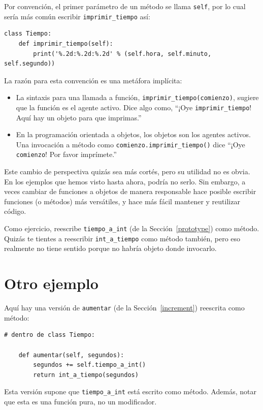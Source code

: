 \documentclass[10pt]{book}
\begin{document}
Por convención, el primer parámetro de un método se
llama {\tt self}, por lo cual sería más común escribir
\verb"imprimir_tiempo" así:

\begin{verbatim}
class Tiempo:
    def imprimir_tiempo(self):
        print('%.2d:%.2d:%.2d' % (self.hora, self.minuto, self.segundo))
\end{verbatim}
%
La razón para esta convención es una metáfora implícita:

\begin{itemize}

\item La sintaxis para una llamada a función, \verb"imprimir_tiempo(comienzo)",
  sugiere que la función es el agente activo.  Dice algo
  como, ``¡Oye \verb"imprimir_tiempo"!  Aquí hay un objeto para que imprimas.''

\item En la programación orientada a objetos, los objetos son los agentes
  activos.  Una invocación a método como \verb"comienzo.imprimir_tiempo()" dice
  ``¡Oye {\tt comienzo}!  Por favor imprímete.''

\end{itemize}

Este cambio de perspectiva quizás sea más cortés, pero su utilidad
no es obvia.  En los ejemplos que hemos visto hasta ahora, podría no
serlo.  Sin embargo, a veces cambiar de funciones a objetos de manera
responsable hace posible escribir funciones (o métodos) más versátiles,
y hace más fácil mantener y reutilizar código.

Como ejercicio, reescribe \verb"tiempo_a_int" (de la
Sección~\ref{prototype}) como método.  Quizás te tientes a
reescribir \verb"int_a_tiempo" como método también, pero eso realmente
no tiene sentido porque no habría objeto donde
invocarlo.


\section{Otro ejemplo}

Aquí hay una versión de {\tt aumentar} (de la Sección~\ref{increment})
reescrita como método:

\begin{verbatim}
# dentro de class Tiempo:

    def aumentar(self, segundos):
        segundos += self.tiempo_a_int()
        return int_a_tiempo(segundos)
\end{verbatim}
%
Esta versión supone que \verb"tiempo_a_int" está escrito
como método.  Además, notar que
esta es una función pura, no un modificador.
\end{document}
